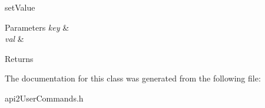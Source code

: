set\-Value 


\begin{DoxyParams}{Parameters}
{\em key} & \\
\hline
{\em val} & \\
\hline
\end{DoxyParams}
\begin{DoxyReturn}{Returns}

\end{DoxyReturn}


The documentation for this class was generated from the following file\-:\begin{DoxyCompactItemize}
\item 
api2\-User\-Commands.\-h\end{DoxyCompactItemize}
